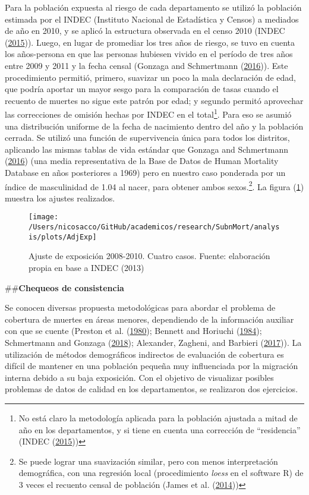 \documentclass[12pt,]{article}
\begin{document}
Para la población expuesta al riesgo de cada departamento se utilizó la
población estimada por el INDEC (Instituto Nacional de Estadística y
Censos) a mediados de año en 2010, y se aplicó la estructura observada
en el censo 2010 (INDEC (\protect\hyperlink{ref-INDEC2015}{2015})).
Luego, en lugar de promediar los tres años de riesgo, se tuvo en cuenta
los años-persona en que las personas hubiesen vivido en el período de
tres años entre 2009 y 2011 y la fecha censal (Gonzaga and Schmertmann
(\protect\hyperlink{ref-Gonzaga_Schmertmann_2016}{2016})). Este
procedimiento permitió, primero, suavizar un poco la mala declaración de
edad, que podría aportar un mayor sesgo para la comparación de tasas
cuando el recuento de muertes no sigue este patrón por edad; y segundo
permitó aprovechar las correcciones de omisión hechas por INDEC en el
total\footnote{No está claro la metodología aplicada para la población
  ajustada a mitad de año en los departamentos, y si tiene en cuenta una
  corrección de ``residencia'' (INDEC
  (\protect\hyperlink{ref-INDEC2015}{2015}))}. Para eso se asumió una
distribución uniforme de la fecha de nacimiento dentro del año y la
población cerrada. Se utilizó una función de supervivencia única para
todos los distritos, aplicando las mismas tablas de vida estándar que
Gonzaga and Schmertmann
(\protect\hyperlink{ref-Gonzaga_Schmertmann_2016}{2016}) (una media
representativa de la Base de Datos de Human Mortality Database en años
posteriores a 1969) pero en nuestro caso ponderada por un índice de
masculinidad de 1.04 al nacer, para obtener ambos sexos.\footnote{Se
  puede lograr una suavización similar, pero con menos interpretación
  demográfica, con una regresión local (procedimiento \emph{loess} en el
  software R) de 3 veces el recuento censal de población (James et al.
  (\protect\hyperlink{ref-James2014}{2014}))}. La figura
(\ref{fig:AdjExp}) muestra los ajustes realizados.

\begin{figure}

{\centering \texttt{[image: /Users/nicosacco/GitHub/academicos/research/SubnMort/analysis/plots/AdjExp]} 

}

\caption{Ajuste de exposición 2008-2010. Cuatro casos. Fuente: elaboración propia en base a INDEC (2013)}\label{fig:AdjExp}
\end{figure}

\#\#\textbf{Chequeos de consistencia}

Se conocen diversas propuesta metodológicas para abordar el problema de
cobertura de muertes en áreas menores, dependiendo de la información
auxiliar con que se cuente (Preston et al.
(\protect\hyperlink{ref-Preston1980}{1980}); Bennett and Horiuchi
(\protect\hyperlink{ref-Bennett_Horiuchi_1984}{1984}); Schmertmann and
Gonzaga (\protect\hyperlink{ref-Schmertmann2018}{2018}); Alexander,
Zagheni, and Barbieri (\protect\hyperlink{ref-Alexander2017}{2017})). La
utilización de métodos demográficos indirectos de evaluación de
cobertura es difícil de mantener en una población pequeña muy
influenciada por la migración interna debido a su baja exposición. Con
el objetivo de visualizar posibles problemas de datos de calidad en los
departamentos, se realizaron dos ejercicios.
\end{document}

